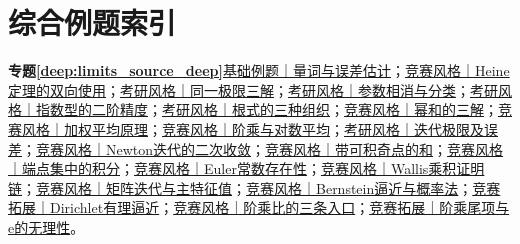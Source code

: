 \section{综合例题索引}
\par\noindent\textbf{专题\ref{deep:limits_source_deep}}\quad \hyperref[deep:ex:limits_source_deep:eps]{基础例题｜量词与误差估计}；\hyperref[deep:ex:limits_source_deep:heine]{竞赛风格｜Heine定理的双向使用}；\hyperref[deep:ex:limits_source_deep:sin]{考研风格｜同一极限三解}；\hyperref[deep:ex:limits_source_deep:log]{考研风格｜参数相消与分类}；\hyperref[deep:ex:limits_source_deep:exponential]{考研风格｜指数型的二阶精度}；\hyperref[deep:ex:limits_source_deep:rationalization]{考研风格｜根式的三种组织}；\hyperref[deep:ex:limits_source_deep:powersum]{竞赛风格｜幂和的三解}；\hyperref[deep:ex:limits_source_deep:weighted]{竞赛风格｜加权平均原理}；\hyperref[deep:ex:limits_source_deep:factorial]{竞赛风格｜阶乘与对数平均}；\hyperref[deep:ex:limits_source_deep:sqrt]{考研风格｜迭代极限及误差}；\hyperref[deep:ex:limits_source_deep:newton]{竞赛风格｜Newton迭代的二次收敛}；\hyperref[deep:ex:limits_source_deep:singular]{竞赛风格｜带可积奇点的和}；\hyperref[deep:ex:limits_source_deep:laplace]{竞赛风格｜端点集中的积分}；\hyperref[deep:ex:limits_source_deep:gamma]{竞赛风格｜Euler常数存在性}；\hyperref[deep:ex:limits_source_deep:wallis]{竞赛风格｜Wallis乘积证明链}；\hyperref[deep:ex:limits_source_deep:matrix]{竞赛风格｜矩阵迭代与主特征值}；\hyperref[deep:ex:limits_source_deep:probability]{竞赛风格｜Bernstein逼近与概率法}；\hyperref[deep:ex:limits_source_deep:dirichlet]{竞赛拓展｜Dirichlet有理逼近}；\hyperref[deep:ex:limits_source_deep:stirlingcase]{竞赛风格｜阶乘比的三条入口}；\hyperref[deep:ex:limits_source_deep:eirrat]{竞赛拓展｜阶乘尾项与e的无理性}。\par
